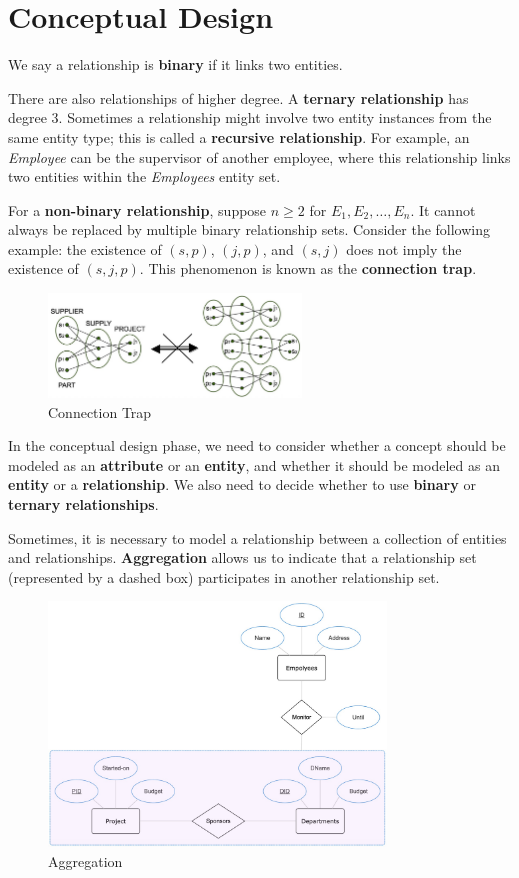 \section{Conceptual Design}
We say a relationship is \textbf{binary} if it links two entities.  

There are also relationships of higher degree. A \textbf{ternary relationship} has degree 3. Sometimes a relationship might involve two entity instances from the same entity type; this is called a \textbf{recursive relationship}. For example, an \emph{Employee} can be the supervisor of another employee, where this relationship links two entities within the \emph{Employees} entity set.  

For a \textbf{non-binary relationship}, suppose \(n \geq 2\) for \(E_1, E_2, \dots, E_n\). It cannot always be replaced by multiple binary relationship sets. Consider the following example: the existence of \((s, p)\), \((j, p)\), and \((s, j)\) does not imply the existence of \((s, j, p)\). This phenomenon is known as the \textbf{connection trap}.  

\begin{figure}[H]
  \centering
  \includegraphics[width=0.6\textwidth]{Figure/ER7.pdf}
  \caption{Connection Trap}
\end{figure}

In the conceptual design phase, we need to consider whether a concept should be modeled as an \textbf{attribute} or an \textbf{entity}, and whether it should be modeled as an \textbf{entity} or a \textbf{relationship}. We also need to decide whether to use \textbf{binary} or \textbf{ternary relationships}.  

Sometimes, it is necessary to model a relationship between a collection of entities and relationships. \textbf{Aggregation} allows us to indicate that a relationship set (represented by a dashed box) participates in another relationship set.

\begin{figure}[H]
  \centering
  \includegraphics[width=0.8\textwidth]{Figure/ER8.pdf}
  \caption{Aggregation}
\end{figure}

